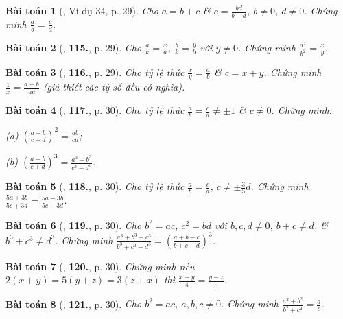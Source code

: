 \documentclass{article}
\numberwithin{equation}{section}
\newtheorem{baitoan}{Bài toán}
\begin{document}
\begin{baitoan}[\cite{Tuyen_Toan_7}, Ví dụ 34, p. 29]
	Cho $a = b + c$ \& $c = \frac{bd}{b - d}$, $b\ne 0$, $d\ne 0$. Chứng minh $\frac{a}{b} = \frac{c}{d}$.
\end{baitoan}

\begin{baitoan}[\cite{Tuyen_Toan_7}, \textbf{115.}, p. 29]
	Cho $\frac{a}{k} = \frac{x}{a}$, $\frac{b}{k} = \frac{y}{b}$ với $y\ne 0$. Chứng minh $\frac{a^2}{b^2} = \frac{x}{y}$.
\end{baitoan}

\begin{baitoan}[\cite{Tuyen_Toan_7}, \textbf{116.}, p. 29]
	Cho tỷ lệ thức $\frac{x}{y} = \frac{a}{b}$ \& $c = x + y$. Chứng minh $\frac{1}{x} = \frac{a + b}{ac}$ (giả thiết các tỷ số đều có nghĩa).
\end{baitoan}

\begin{baitoan}[\cite{Tuyen_Toan_7}, \textbf{117.}, p. 30]
	Cho tỷ lệ thức $\frac{a}{b} = \frac{c}{d}\ne\pm 1$ \& $c\ne 0$. Chứng minh:
	\begin{enumerate*}
		\item[(a)] $\left(\frac{a - b}{c - d}\right)^2 = \frac{ab}{cd}$;
		\item[(b)] $\left(\frac{a + b}{c + d}\right)^3 = \frac{a^3 - b^3}{c^3 - d^3}$.
	\end{enumerate*}
\end{baitoan}

\begin{baitoan}[\cite{Tuyen_Toan_7}, \textbf{118.}, p. 30]
	Cho tỷ lệ thức $\frac{a}{b} = \frac{c}{d}$, $c\ne\pm\frac{3}{5}d$. Chứng minh $\frac{5a + 3b}{5c + 3d} = \frac{5a - 3b}{5c - 3d}$.
\end{baitoan}

\begin{baitoan}[\cite{Tuyen_Toan_7}, \textbf{119.}, p. 30]
	Cho $b^2 = ac$, $c^2 = bd$ với $b,c,d\ne 0$, $b + c\ne d$, \& $b^3 + c^3\ne d^3$. Chứng minh $\frac{a^3 + b^3 - c^3}{b^3 + c^3 - d^3} = \left(\frac{a + b - c}{b + c - d}\right)^3$.
\end{baitoan}

\begin{baitoan}[\cite{Tuyen_Toan_7}, \textbf{120.}, p. 30]
	Chứng minh nếu $2(x + y) = 5(y + z) = 3(z + x)$ thì $\frac{x - y}{4} = \frac{y - z}{5}$.
\end{baitoan}

\begin{baitoan}[\cite{Tuyen_Toan_7}, \textbf{121.}, p. 30]
	Cho $b^2 = ac$, $a,b,c\ne 0$. Chứng minh $\frac{a^2 + b^2}{b^2 + c^2} = \frac{a}{c}$.
\end{baitoan}
\end{document}
